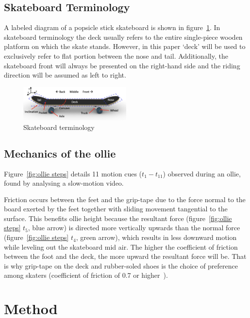 \documentclass[default,iicol]{sn-jnl}
\begin{document}
\subsection{Skateboard Terminology}
A labeled diagram of a popsicle stick skateboard is shown in figure~\ref{fig:skateboard terminology}. 
In skateboard terminology the deck usually refers to the entire single-piece wooden platform on which the skate stands.
However, in this paper `deck' will be used to exclusively refer to flat portion between the nose and tail.
Additionally, the skateboard front will always be presented on the right-hand side and the riding direction will be assumed as left to right.

\begin{figure}[t]
    \includegraphics[width=0.5\textwidth]{figure/terminology.png}
    \caption[Skateboard terminology]{Skateboard terminology}
    \label{fig:skateboard terminology}
\end{figure}

\subsection{Mechanics of the ollie} \label{ss_mechanics}
Figure~\ref{fig:ollie steps} details 11 motion cues ($t_1-t_{11}$) observed during an ollie, found by analysing a slow-motion video.

Friction occurs between the feet and the grip-tape due to the force normal to the board exerted by the feet together with sliding movement tangential to the surface.
This benefits ollie height because the resultant force (figure~\ref{fig:ollie steps} $t_5$, blue arrow) is directed more vertically upwards than the normal force (figure~\ref{fig:ollie steps} $t_4$, green arrow), which results in less downward motion while leveling out the skateboard mid air.
The higher the coefficient of friction between the foot and the deck, the more upward the resultant force will be.
That is why grip-tape on the deck and rubber-soled shoes is the choice of preference among skaters (coefficient of friction of 0.7 or higher~\cite{bron_nog_nodate}).

\section{Method}
\end{document}
